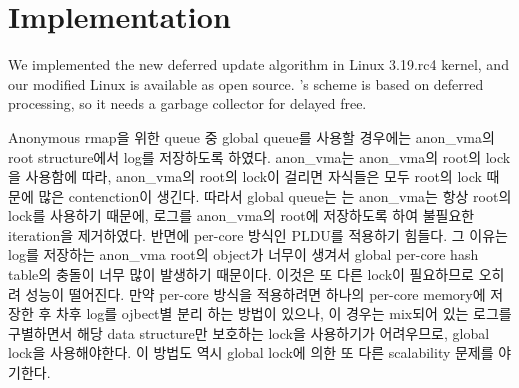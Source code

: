 \section{Implementation}\label{sec:implementation}

We implemented the new deferred update algorithm in Linux 3.19.rc4 kernel, and
our modified Linux is available as open source.
's scheme is based on deferred processing, so it needs a garbage
collector for delayed free.




Anonymous rmap을 위한 queue 중 global queue를 사용할 경우에는 anon\_vma의 root
structure에서 log를 저장하도록 하였다.
anon\_vma는 anon\_vma의 root의 lock을 사용함에 따라, anon\_vma의 root의 lock이 걸리면 자식들은
모두 root의 lock 때문에 많은 contenction이 생긴다.
따라서 global queue는 는 anon\_vma는 항상 root의 lock를 사용하기 때문에, 로그를 anon\_vma의 root에
저장하도록 하여 불필요한 iteration을 제거하였다. 
반면에 per-core 방식인 PLDU를 적용하기 힘들다.
그 이유는 log를 저장하는 anon\_vma root의 object가 너무이 생겨서 global per-core hash
table의 충돌이 너무 많이 발생하기 때문이다. 
이것은 또 다른 lock이 필요하므로 오히려 성능이 떨어진다. 
만약 per-core 방식을 적용하려면 하나의 per-core memory에 저장한 후 차후 log를 ojbect별 분리 하는 방법이 있으나, 
이 경우는  mix되어 있는 로그를 구별하면서 해당 data structure만 보호하는 lock을 사용하기가 어려우므로, global
lock을 사용해야한다.
이 방법도 역시 global lock에 의한 또 다른 scalability 문제를 야기한다.


















